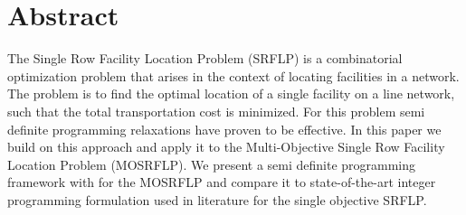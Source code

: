 \documentclass[a4paper]{article}
\begin{document}
\section*{Abstract}
The Single Row Facility Location Problem (SRFLP) is a combinatorial optimization problem that arises in the context of locating facilities in a network. The problem is to find the optimal location of a single facility on a line network, such that the total transportation cost is minimized. For this problem semi definite programming relaxations have proven to be effective. In this paper we build on this approach and apply it to the Multi-Objective Single Row Facility Location Problem (MOSRFLP). We present a semi definite programming framework with for the MOSRFLP and compare it to state-of-the-art integer programming formulation used in literature for the single objective SRFLP. 
\end{document}
